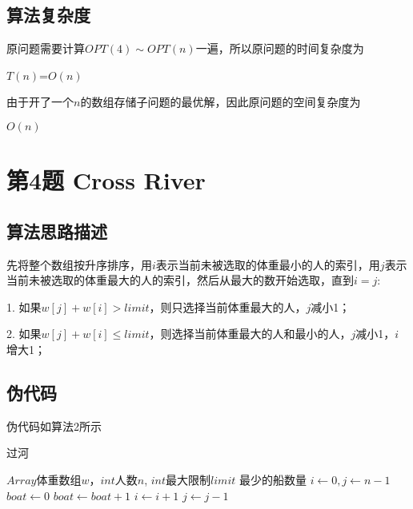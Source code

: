 \documentclass{article}
\begin{document}
\subsection{算法复杂度}
原问题需要计算$OPT(4) \sim OPT(n)$一遍，所以原问题的时间复杂度为
\begin{center}
    $T(n)$=$O(n)$ 
\end{center} 
\par 由于开了一个$n$的数组存储子问题的最优解，因此原问题的空间复杂度为
\begin{center}
    $O(n)$
\end{center} 


\section{第4题 Cross River}
\subsection{算法思路描述}
\par 先将整个数组按升序排序，用$i$表示当前未被选取的体重最小的人的索引，用$j$表示当前未被选取的体重最大的人的索引，然后从最大的数开始选取，直到$i=j$:
\par 1. 如果$w[j]+w[i]>limit$，则只选择当前体重最大的人，$j$减小1；
\par 2. 如果$w[j]+w[i] \leq limit$，则选择当前体重最大的人和最小的人，$j$减小1，$i$增大1；

\subsection{伪代码}
\par 伪代码如算法2所示

\begin{algorithm}[ht]
    \caption{过河}
    \begin{algorithmic}[1] %
        \Require $Array$体重数组$w$，$int$人数$n$, $int$最大限制$limit$
        \Ensure 最少的船数量
            \EndIf
            \State{}
            \State $i \gets 0, j \gets n-1$
            \State $boat \gets 0$
                \State $boat \gets boat + 1$
                    \State $i \gets i+1$
                \EndIf
                \State $j \gets j-1$
            \EndWhile
            \State {}
        \EndFunction
    \end{algorithmic}
\end{algorithm}
\end{document}

